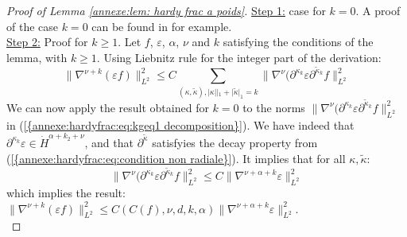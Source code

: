 \documentclass[11pt,a4paper,reqno]{amsart}
\theoremstyle{remark}
\numberwithin{equation}{section}
\begin{document}
\begin{appendix}
\begin{proof}[Proof of Lemma \ref{annexe:lem: hardy frac a poids}]
 \underline{Step 1:} case for $k=0$. A proof of the case $k=0$ can be found in \cite{MRRod2} for example.\\

\underline{Step 2:} Proof for $k\geq 1$. Let $f$, $\varepsilon$, $\alpha$, $\nu$ and $k$ satisfying the conditions of the lemma, with $k\geq 1$. Using Liebnitz rule for the integer part of the derivation:
\begin{equation} \label{annexe:hardyfrac:eq:kgeq1 decomposition}
\parallel \nabla^{\nu+k}(\varepsilon f) \parallel_{L^2}^2\leq C \sum_{(\kappa,\tilde{\kappa}), |\kappa||_1+|\tilde{\kappa}|_1=k} \parallel \nabla^{\nu} (\partial^{\kappa_k}\varepsilon\partial^{\tilde{\kappa}_k}f \parallel_{L^2}^2
\end{equation}
We can now apply the result obtained for $k=0$ to the norms $\parallel \nabla^{\nu} (\partial^{\kappa_k}\varepsilon\partial^{\tilde{\kappa}_k}f \parallel_{L^2}^2$ in {{\rm (\ref{{annexe:hardyfrac:eq:kgeq1 decomposition}})}}. We have indeed that $\partial^{\kappa_k}\varepsilon\in \dot{H}^{\alpha+k_2+\nu} $, and that $\partial^{\tilde{\kappa}}$ satisfyies the decay property from {{\rm (\ref{{annexe:hardyfrac:eq:condition non radiale}})}}. It implies that for all $\kappa,\tilde{\kappa}$:
$$
\parallel \nabla^{\nu} (\partial^{\kappa_k}\varepsilon\partial^{\tilde{\kappa}_k}f \parallel_{L^2}^2\leq C \parallel \nabla^{\nu+\alpha+k} \varepsilon \parallel_{L^2}^2
$$
which implies the result: $\parallel \nabla^{\nu+k}(\varepsilon f) \parallel_{L^2}^2\leq C(C(f),\nu,d,k,\alpha) \parallel \nabla^{\nu+\alpha+k} \varepsilon \parallel_{L^2}^2$.\\


\end{proof}
\end{appendix}
\end{document}
